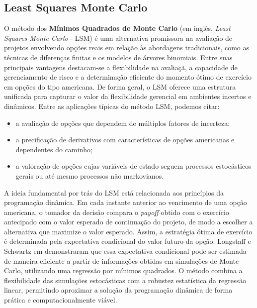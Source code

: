 \subsection{Least Squares Monte Carlo}

O método dos \textbf{Mínimos Quadrados de Monte Carlo} (em inglês, \textit{Least Squares Monte Carlo} - LSM) é uma alternativa promissora na avaliação de projetos envolvendo opções reais em relação às abordagens tradicionais, como as técnicas de diferenças finitas e os modelos de árvores binomiais. Entre suas principais vantagens destacam-se a flexibilidade na avaliaçã, a capacidade de gerenciamento de risco e a determinação eficiente do momento ótimo de exercício em opções do tipo americana. De forma geral, o LSM oferece uma estrutura unificada para capturar o valor da flexibilidade gerencial em ambientes incertos e dinâmicos. Entre as aplicações típicas do método LSM, podemos citar:
\begin{itemize}
    \item a avaliação de opções que dependem de múltiplos fatores de incerteza;
    \item a precificação de derivativos com características de opções americanas e dependentes do caminho;
    \item a valoração de opções cujas variáveis de estado seguem processos estocásticos gerais ou até mesmo processos não markovianos.
\end{itemize}

A ideia fundamental por trás do LSM está relacionada aos princípios da programação dinâmica. Em cada instante anterior ao vencimento de uma opção americana, o tomador da decisão compara o \textit{payoff} obtido com o exercício antecipado com o valor esperado de continuação do projeto, de modo a escolher a alternativa que maximize o valor esperado. Assim, a estratégia ótima de exercício é determinada pela expectativa condicional do valor futuro da opção. Longstaff e Schwartz em \cite{25} demonstraram que essa expectativa condicional pode ser estimada de maneira eficiente a partir de informações obtidas em simulações de Monte Carlo, utilizando uma regressão por mínimos quadrados. O método combina a flexibilidade das simulações estocásticas com a robustez estatística da regressão linear, permitindo aproximar a solução da programação dinâmica de forma prática e computacionalmente viável.

